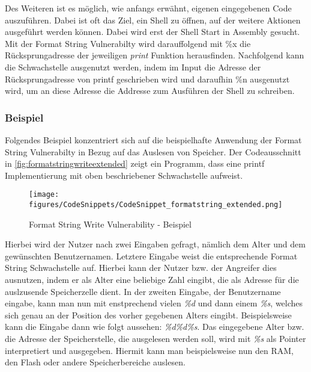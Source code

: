 \documentclass[a4paper,
DIV=13,
12pt,
BCOR=10mm,
department=FakIM,
oneside,
parskip=half,
automark,
listof=totocnumbered,
bibliography=totocnumbered,
acronym=totocnumbered
] {OTHRartcl}
\begin{document}
Des Weiteren ist es möglich, wie anfangs erwähnt, eigenen eingegebenen Code auszuführen. Dabei ist oft das Ziel,
ein Shell zu öffnen, auf der weitere Aktionen ausgeführt werden können.
Dabei wird erst der Shell Start in Assembly gesucht. Mit der Format String Vulnerabilty wird darauffolgend mit \%x die Rücksprungadresse
der jeweiligen \textit{print} Funktion herausfinden. Nachfolgend kann die Schwachstelle ausgenutzt werden, indem im Input die Adresse der Rücksprungadresse von printf geschrieben wird
und daraufhin \%n ausgenutzt wird, um an diese Adresse die Addresse zum Ausführen der Shell zu schreiben.

\subsubsection{Beispiel}
Folgendes Beispiel konzentriert sich auf die beispielhafte Anwendung der Format String Vulnerabilty in Bezug auf das Auslesen von Speicher.
Der Codeausschnitt in \autoref{fig:formatstringwriteextended} zeigt ein Programm, dass eine printf Implementierung mit oben beschriebener Schwachstelle aufweist.
\begin{figure}[ht!]
  \begin{center}
    \texttt{[image: figures/CodeSnippets/CodeSnippet\_formatstring\_extended.png]}
    \caption{Format String Write Vulnerability - Beispiel}
    \label{fig:formatstringwriteextended}
  \end{center}
\end{figure}
Hierbei wird der Nutzer nach zwei Eingaben gefragt, nämlich dem Alter und dem gewünschten Benutzernamen.
Letztere Eingabe weist die entsprechende Format String Schwachstelle auf.
Hierbei kann der Nutzer bzw. der Angreifer dies ausnutzen, indem er als Alter eine beliebige Zahl eingibt, die als Adresse für die auslzusende Speicherzelle dient.
In der zweiten Eingabe, der Benutzername eingabe, kann man nun mit enstprechend vielen \textit{\%d} und dann einem \textit{\%s}, welches sich genau an der Position des
vorher gegebenen Alters eingibt. Beispielsweise kann die Eingabe dann wie folgt aussehen: \textit{\%d\%d\%s}.
Das eingegebene Alter bzw. die Adresse der Speicherstelle, die ausgelesen werden soll, wird mit \textit{\%s} als Pointer interpretiert und ausgegeben.
Hiermit kann man beispielsweise nun den RAM, den Flash oder andere Speicherbereiche auslesen.
\end{document}
